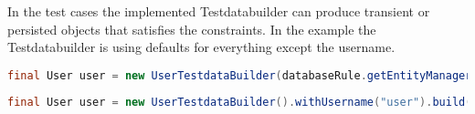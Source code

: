 In the test cases the implemented Testdatabuilder can produce transient or persisted objects that satisfies the constraints. In the example the Testdatabuilder is using defaults for everything except the username.

\begin{lstlisting}[language={JAVA},caption=Build an persistent User object]
final User user = new UserTestdataBuilder(databaseRule.getEntityManager()).withUsername("user").buildAndSave();
\end{lstlisting}

\begin{lstlisting}[language={JAVA},caption=Build an transient User object]
final User user = new UserTestdataBuilder().withUsername("user").build()
\end{lstlisting}
